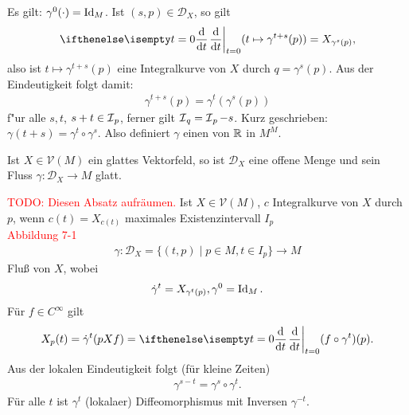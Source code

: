 \begin{bem*}
  Es gilt: $\gamma^0(\cdot) = \operatorname{Id}_M$. Ist $(s,p) \in \mathcal D_{X}$, so gilt
  \[ \difffrac[t=0]{}{t}(t \mapsto \gamma^{t+s}(p)) = X_{\gamma^s(p)}, \]
  also ist $t \mapsto \gamma^{t+s}(p)$ eine Integralkurve von $X$ durch $q = \gamma^s(p)$. Aus der Eindeutigkeit folgt damit:
  \begin{align*}
    \gamma^{t+s}(p) = \gamma^t(\gamma^s(p))
  \end{align*}
  f"ur alle $s, t$, $s+t \in \operatorname{\mathcal{I}}_p$, ferner gilt $\operatorname{\mathcal{I}}_q = \operatorname{\mathcal{I}}_p - s$. Kurz geschrieben: $\gamma(t+s) = \gamma^t \circ \gamma^s$. Also definiert $\gamma$ einen  von $\operatorname{\mathbb{R}}$ in $M^M$.
\end{bem*}


\begin{satz}
  Ist $X \in \mathcal V(M)$ ein glattes Vektorfeld, so ist $\mathcal D_X$ eine offene Menge und sein Fluss $\gamma \colon \mathcal D_X \to M$ glatt.
\end{satz}



\begin{bem}[Erinnerung]
  \textcolor{red}{TODO: Diesen Absatz aufräumen.}
  Ist $X \in \mathcal V(M)$, $c$ Integralkurve von $X$ durch $p$, wenn $c(t) = X_{c(t)}$ maximales Existenzintervall $I_p$\\

  \textcolor{red}{Abbildung 7-1}\\

  \begin{align*}
    \gamma \colon \mathcal D_X = \{(t,p) \mid p \in M, t \in I_p\} \to M
  \end{align*}
  Fluß von $X$, wobei
  \begin{align*}
    \dot \gamma^t = X_{\gamma^t(p)}, \gamma^0 = \operatorname{Id}_M.
  \end{align*}
  Für $f \in C^{\infty}$ gilt
  \begin{align*}
    X_p(t) = \dot \gamma^t(pXf) = \difffrac[t=0]{}{t}(f \circ \gamma^t)(p).
  \end{align*}
  Aus der lokalen Eindeutigkeit folgt (für kleine Zeiten)
  \begin{align*}
    \gamma^{s-t} = \gamma^s \circ \gamma^t.
  \end{align*}
  Für alle $t$ ist $\gamma^t$ (lokalaer) Diffeomorphismus mit Inversen $\gamma^{-t}$.
\end{bem}

